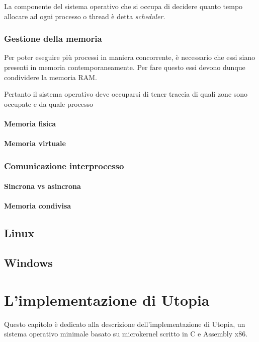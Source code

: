 \documentclass[12pt,a4paper]{report}
\begin{document}
			La componente del sistema operativo che si occupa di decidere quanto tempo allocare ad ogni processo o thread
			è detta \emph{scheduler}.
				
		\subsection{Gestione della memoria}
			Per poter eseguire più processi in maniera concorrente, è necessario che essi siano presenti in memoria
			contemporaneamente. Per fare questo essi devono dunque condividere la memoria RAM.
			
			Pertanto il sistema operativo deve occuparsi di tener traccia di quali zone sono occupate e da quale
			processo
			
			\subsubsection{Memoria fisica}
			\subsubsection{Memoria virtuale}
					
		\subsection{Comunicazione interprocesso}
			\subsubsection{Sincrona vs asincrona}
			\subsubsection{Memoria condivisa}
	
	\section{Linux}
	
	\section{Windows}

\chapter{L'implementazione di Utopia}
	Questo capitolo è dedicato alla descrizione dell'implementazione di Utopia, un sistema operativo
	minimale basato su microkernel scritto in C e Assembly x86.
	
\end{document}
